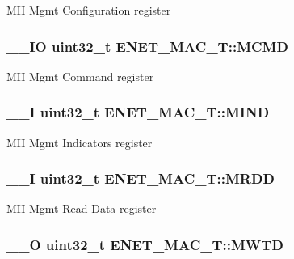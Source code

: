 M\+I\+I Mgmt Configuration register \hypertarget{struct_e_n_e_t___m_a_c___t_af5015dd00c915a85f7aa387444349f59}{
\subsubsection[{M\+C\+M\+D}]{\setlength{\rightskip}{0pt plus 5cm}\+\_\+\+\_\+\+I\+O uint32\+\_\+t E\+N\+E\+T\+\_\+\+M\+A\+C\+\_\+\+T\+::\+M\+C\+M\+D}}\label{struct_e_n_e_t___m_a_c___t_af5015dd00c915a85f7aa387444349f59}
M\+I\+I Mgmt Command register \hypertarget{struct_e_n_e_t___m_a_c___t_a6d107736b77b59d7188fb6faa04ea549}{
\subsubsection[{M\+I\+N\+D}]{\setlength{\rightskip}{0pt plus 5cm}\+\_\+\+\_\+\+I uint32\+\_\+t E\+N\+E\+T\+\_\+\+M\+A\+C\+\_\+\+T\+::\+M\+I\+N\+D}}\label{struct_e_n_e_t___m_a_c___t_a6d107736b77b59d7188fb6faa04ea549}
M\+I\+I Mgmt Indicators register \hypertarget{struct_e_n_e_t___m_a_c___t_a98a3f303ec4276150d3d4b8586f2a71d}{
\subsubsection[{M\+R\+D\+D}]{\setlength{\rightskip}{0pt plus 5cm}\+\_\+\+\_\+\+I uint32\+\_\+t E\+N\+E\+T\+\_\+\+M\+A\+C\+\_\+\+T\+::\+M\+R\+D\+D}}\label{struct_e_n_e_t___m_a_c___t_a98a3f303ec4276150d3d4b8586f2a71d}
M\+I\+I Mgmt Read Data register \hypertarget{struct_e_n_e_t___m_a_c___t_a588ac0beb769e9cabb7039582625a3e0}{
\subsubsection[{M\+W\+T\+D}]{\setlength{\rightskip}{0pt plus 5cm}\+\_\+\+\_\+\+O uint32\+\_\+t E\+N\+E\+T\+\_\+\+M\+A\+C\+\_\+\+T\+::\+M\+W\+T\+D}}\label{struct_e_n_e_t___m_a_c___t_a588ac0beb769e9cabb7039582625a3e0}
